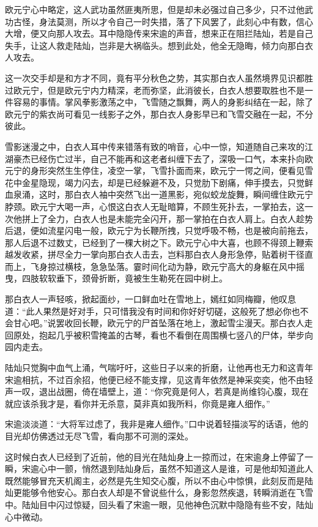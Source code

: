 欧元宁心中略定，这人武功虽然匪夷所思，但是却未必强过自己多少，只不过他武功古怪，身法莫测，所以才令自己一时失措，落了下风罢了，此刻心中有数，信心大增，便又向那人攻去。耳中隐隐传来宋逾的声音，想来正在阻拦陆灿，若是自己失手，让这人救走陆灿，岂非是大祸临头。想到此处，他全无隐晦，倾力向那白衣人攻去。

这一次交手却是和方才不同，竟有平分秋色之势，其实那白衣人虽然境界见识都胜过欧元宁，但是欧元宁内力精深，老而弥坚，此消彼长，白衣人想要取胜也不是一件容易的事情。掌风拳影激荡之中，飞雪随之飘舞，两人的身影纠结在一起，除了欧元宁的紫衣尚可看见一线影子之外，那白衣人身影早已和飞雪交融在一起，不分彼此。

雪影迷漫之中，白衣人耳中传来错落有致的哨音，心中一惊，知道随自己来攻的江湖豪杰已经伤亡过半，自己不能再和这老者纠缠下去了，深吸一口气，本来扑向欧元宁的身形突然生生停住，凌空一掌，飞雪扑面而来，欧元宁一愕之间，便看见雪花中金星隐现，竭力闪去，却是已经躲避不及，只觉肋下剧痛，伸手摸去，只觉鲜血泉涌，这时，那白衣人袖中突然飞出一道黑影，宛似蛟龙旋舞，瞬间缠住欧元宁脖颈。欧元宁大喝一声，心恨这白衣人无耻暗算，不顾生死扑去，一掌拍去，这一次他拼上了全力，白衣人也是未能完全闪开，那一掌拍在白衣人肩上。白衣人趁势后退，便如流星闪电一般，欧元宁为长鞭所拽，只觉呼吸不畅，也是被向前拖去，那人后退不过数丈，已经到了一棵大树之下。欧元宁心中大喜，也顾不得颈上鞭索越发收紧，拼尽全力一掌向那白衣人击去，岂料那白衣人身形急停，贴着树干径直而上，飞身掠过横枝，急急坠落。霎时间化动为静，欧元宁高大的身躯在风中摇曳，四肢软软垂下，颈骨折断，竟被生生勒死在园中树上。

那白衣人一声轻咳，掀起面纱，一口鲜血吐在雪地上，嫣红如同梅瓣，他叹息道：“此人果然是好对手，只可惜我没有时间和你好好切磋，这般死了想必你也不会甘心吧。”说罢收回长鞭，欧元宁的尸首坠落在地上，激起雪尘漫天。那白衣人走回原处，抱起几乎被积雪掩盖的古琴，看也不看倒在周围横七竖八的尸体，举步向园内走去。

陆灿只觉胸中血气上涌，气喘吁吁，这些日子以来的折磨，让他再也无力和这青年宋逾相抗，不过百余招，他便已经不能支撑，见这青年依然是神采奕奕，他不由轻声一叹，退出战圈，倚在墙壁上，道：“你究竟是何人，若真是尚维钧心腹，现在就应该杀我才是，看你并无杀意，莫非真如我所料，你竟是雍人细作。”

宋逾淡淡道：“大将军过虑了，我非是雍人细作。”口中说着轻描淡写的话语，他的目光却仿佛透过无尽飞雪，看向那不可测的深处。

这时候白衣人已经到了近前，他的目光在陆灿身上一掠而过，在宋逾身上停留了一瞬，宋逾心中一颤，悄然退到陆灿身后，虽然不知道这人是谁，可是他却知道此人既然能够冒充天机阁主，必然是先生知交心腹，所以不由心中惊惧，此刻反而是陆灿更能够令他安心。那白衣人却是不曾说些什么，身影忽然疾退，转瞬消逝在飞雪中。陆灿目中闪过惊疑，回头看了宋逾一眼，见他神色沉默中隐隐有些不安，陆灿心中微动。

